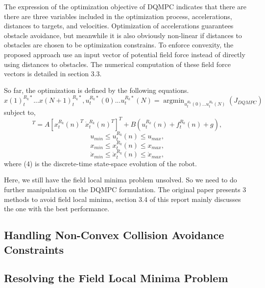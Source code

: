 \documentclass[12pt]{article}
\begin{document}
The expression of the optimization objective of DQMPC indicates that there are there are three variables included in the optimization process, accelerations, distances to targets, and velocities. Optimization of accelerations guarantees obstacle avoidance, but meanwhile it is also obviously non-linear if distances to obstacles are chosen to be optimization constrains. To enforce convexity, the proposed approach use an input vector of potential field force instead of directly using distances to obstacles. The numerical computation of these field force vectors is detailed in section 3.3.

So far, the optimization is defined by the following equations.
\begin{equation}
x(1)_{t}^{R_{k}*}...x(N+1)_{t}^{R_{k}*},u_{t}^{R_{k}*}(0)...u_{t}^{R_{k}*}(N) = \mathop{\arg\min}_{u_{t}^{R_{k}}(0)...u_{t}^{R_{k}}(N)}(J_{DQMPC})
\end{equation}
subject to,
\begin{equation}
[{x}_{t}^{R_{k}}(n+1)^{T}\ \dot{x}_{t}^{R_{k}}(n+1)^{T}]^{T}=A[{x}_{t}^{R_{k}}(n)^{T}\ \dot{x}_{t}^{R_{k}}(n)^{T}]^{T}+B(u_{t}^{R_{k}}(n)+f_{t}^{R_{k}}(n)+g),
\end{equation}
\begin{equation}
u_{min}\leq u_{t}^{R_{k}}(n)\leq u_{max},
\end{equation}
\begin{equation}
x_{min}\leq x_{t}^{R_{k}}(n)\leq x_{max},
\end{equation}
\begin{equation}
\dot{x}_{min}\leq \dot{x}_{t}^{R_{k}}(n)\leq \dot{x}_{max},
\end{equation}
where (4) is the discrete-time state-space evolution of the robot.

Here, we still have the field local minima problem unsolved. So we need to do further manipulation on the DQMPC formulation. The original paper presents 3 methods to avoid field local minima, section 3.4 of this report mainly discusses the one with the best performance.

\subsection{Handling Non-Convex Collision Avoidance Constraints}

\subsection{Resolving the Field Local Minima Problem}




\end{document}
